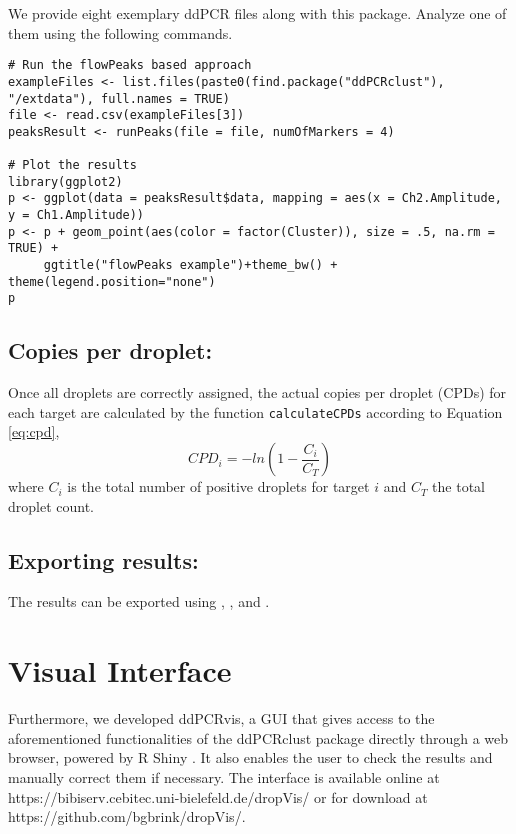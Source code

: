 \documentclass{article}
\begin{document}
We provide eight exemplary ddPCR files along with this package. Analyze one of them using the following commands.
\begin{verbatim}
# Run the flowPeaks based approach
exampleFiles <- list.files(paste0(find.package("ddPCRclust"), "/extdata"), full.names = TRUE)
file <- read.csv(exampleFiles[3])
peaksResult <- runPeaks(file = file, numOfMarkers = 4)

# Plot the results
library(ggplot2)
p <- ggplot(data = peaksResult$data, mapping = aes(x = Ch2.Amplitude, y = Ch1.Amplitude))
p <- p + geom_point(aes(color = factor(Cluster)), size = .5, na.rm = TRUE) +
     ggtitle("flowPeaks example")+theme_bw() + theme(legend.position="none")
p
\end{verbatim}


\subsection{Copies per droplet:}
Once all droplets are correctly assigned, the actual copies per droplet (CPDs) for each target are calculated by the function \texttt{calculateCPDs} according to Equation \ref{eq:cpd},
\begin{equation}\label{eq:cpd}
CPD_i = -ln(1-\frac{C_i}{C_T})
\end{equation}
where $C_i$ is the total number of positive droplets for target $i$ and $C_T$ the total droplet count.

\subsection{Exporting results:}
The results can be exported using , , and . 

\section{Visual Interface}
Furthermore, we developed ddPCRvis, a GUI that gives access to the aforementioned functionalities of the ddPCRclust package directly through a web browser, powered by R Shiny \cite{shiny2017}. 
It also enables the user to check the results and manually correct them if necessary. The interface is available online at https://bibiserv.cebitec.uni-bielefeld.de/dropVis/ or for download at https://github.com/bgbrink/dropVis/.


\end{document}
